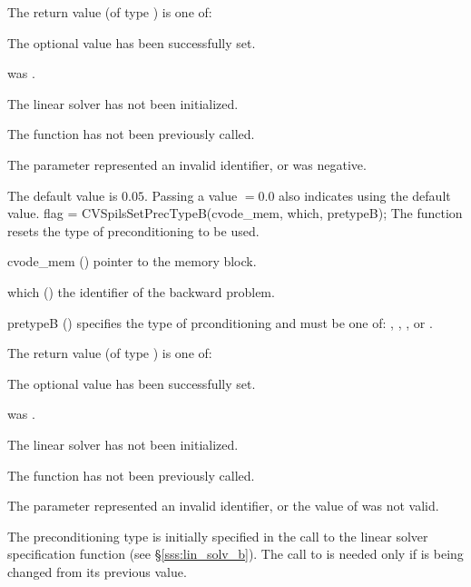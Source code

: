 {
  The return value  (of type ) is one of:
  \begin{args}
  \item[\Id{CVSPILS\_SUCCESS}] 
    The optional value has been successfully set.
  \item[\Id{CVSPILS\_MEM\_NULL}]
     was .
  \item[\Id{CVSPILS\_LMEM\_NULL}]
    The {\cvspils} linear solver has not been initialized.
  \item[\Id{CVSPILS\_NO\_ADJ}]
    The function  has not been previously called.
  \item[\Id{CVSPILS\_ILL\_INPUT}]
    The parameter  represented an invalid identifier, or
     was negative.
  \end{args}
}
{
  The default value is $0.05$.
  Passing a value $ = 0.0$ also indicates using the default value.
}
{
  flag = CVSpilsSetPrecTypeB(cvode\_mem, which, pretypeB);
}
{
  The function  resets the type
  of preconditioning to be used.
}
{
  \begin{args}
  \item[cvode\_mem] ()
    pointer to the {\cvodes} memory block.
  \item[which] ()
    the identifier of the backward problem.
  \item[pretypeB] ()
    specifies the type of prconditioning and must be one of:
    , , , or .
  \end{args}
}
{
  The return value  (of type ) is one of:
  \begin{args}
  \item[\Id{CVSPILS\_SUCCESS}] 
    The optional value has been successfully set.
  \item[\Id{CVSPILS\_MEM\_NULL}]
     was .
  \item[\Id{CVSPILS\_LMEM\_NULL}]
    The {\cvspils} linear solver has not been initialized.
  \item[\Id{CVSPILS\_NO\_ADJ}]
    The function  has not been previously called.
  \item[\Id{CVSPILS\_ILL\_INPUT}]
    The parameter  represented an invalid identifier, or
    the value of  was not valid.
  \end{args}
}
{
  The preconditioning type is initially specified in the call
  to the linear solver specification function (see \S\ref{sss:lin_solv_b}). 
  The call to  is needed only if  is being
  changed from its previous value.
}

